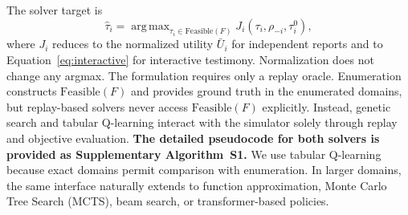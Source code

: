 \documentclass{article}
\newcommand{\Feas}{\mathrm{Feasible}}
\DeclareMathOperator*{\argmax}{arg\,max}
\begin{document}
The solver target is
\[
\hat{\tau}_i
=
\argmax_{\tau_i\in\Feas(F)}
J_i(\tau_i,\rho_{-i},\tau_i^0),
\]
where $J_i$ reduces to the normalized utility $\bar U_i$ for independent reports and to Equation~\ref{eq:interactive} for interactive testimony. Normalization does not change any argmax.
The formulation requires only a replay oracle. Enumeration constructs $\Feas(F)$ and provides ground truth in the enumerated domains, but replay-based solvers never access $\Feas(F)$ explicitly. Instead, genetic search and tabular Q-learning interact with the simulator solely through replay and objective evaluation. \textbf{The detailed pseudocode for both solvers is provided as Supplementary Algorithm~S1.} We use tabular Q-learning because exact domains permit comparison with enumeration. In larger domains, the same interface naturally extends to function approximation, Monte Carlo Tree Search (MCTS), beam search, or transformer-based policies.

\end{document}
